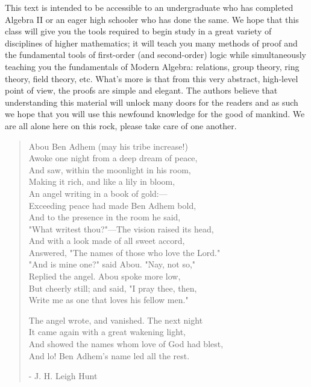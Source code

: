 This text is intended to be accessible to an undergraduate who has completed Algebra II or an eager high schooler who has done the same. We hope that this class will give you the tools required to begin study in a great variety of disciplines of higher mathematics; it will teach you many methods of proof and the fundamental tools of first-order (and second-order) logic while simultaneously teaching you the fundamentals of Modern Algebra: relations, group theory, ring theory, field theory, etc. What's more is that from this very abstract, high-level point of view, the proofs are simple and elegant. 
\noindent The authors believe that understanding this material will unlock many doors for the readers and as such we hope that you will use this newfound knowledge for the good of mankind. We are all alone here on this rock, please take care of one another.\steezybreak
\small
\begin{quote}
Abou Ben Adhem (may his tribe increase!)\\
Awoke one night from a deep dream of peace,\\
And saw, within the moonlight in his room,\\
Making it rich, and like a lily in bloom,\\
An angel writing in a book of gold:—\\
Exceeding peace had made Ben Adhem bold,\\
And to the presence in the room he said,\\
"What writest thou?"—The vision raised its head,\\
And with a look made of all sweet accord,\\
Answered, "The names of those who love the Lord."\\
"And is mine one?" said Abou. "Nay, not so,"\\
Replied the angel. Abou spoke more low,\\
But cheerly still; and said, "I pray thee, then,\\
Write me as one that loves his fellow men."\steezybreak

The angel wrote, and vanished. The next night\\
It came again with a great wakening light,\\
And showed the names whom love of God had blest,\\
And lo! Ben Adhem's name led all the rest.\steezybreak

- J. H. Leigh Hunt
\end{quote} 

